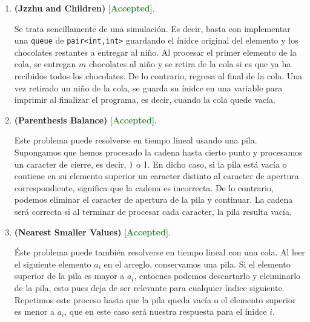 \documentclass{article}
\begin{document}
    \begin{enumerate}[label=\textbf{Problema \arabic*}]
        \item \textbf{(Jzzhu and Children)} [\textcolor{ForestGreen}{\textbf{Accepted}}].
    
        Se trata sencillamente de una simulación. Es decir, basta con implementar una \texttt{queue} de \texttt{pair<int,int>} guardando el ínidce original del elemento y los chocolates restantes a entregar al niño. Al procesar el primer elemento de la cola, se entregan $m$ chocolates al niño y se retira de la cola si es que ya ha recibidos todos los chocolates. De lo contrario, regresa al final de la cola. Una vez retirado un niño de la cola, se guarda su ínidce en una variable para imprimir al finalizar el programa, es decir, cuando la cola quede vacía. 

        \item \textbf{(Parenthesis Balance)} [\textcolor{ForestGreen}{\textbf{Accepted}}].
        
        Este problema puede resolverse en tiempo lineal usando una pila. Supongamos que hemos procesado la cadena hasta cierto punto y procesamos un caracter de cierre, es decir, \texttt{)} o \texttt{]}. En dicho caso, si la pila está vacía o contiene en su elemento superior un caracter distinto al caracter de apertura correspondiente, significa que la cadena es incorrecta. De lo contrario, podemos eliminar el caracter de apertura de la pila y continuar. La cadena será correcta si al terminar de procesar cada caracter, la pila resulta vacía.

        \item \textbf{(Nearest Smaller Values)} [\textcolor{ForestGreen}{\textbf{Accepted}}].
        
        Éste problema puede también resolverse en tiempo lineal con una cola. Al leer el siguiente elemento $a_i$ en el arreglo, conservamos una pila. Si el elemento superior de la pila es mayor a $a_i$, entocnes podemos descartarlo y eleiminarlo de la pila, esto pues deja de ser relevante para cualquier índice siguiente. Repetimos este proceso hasta que la pila queda vacía o el elemento superior es menor a $a_i$, que en este caso será nuestra respuesta para el ínidce $i$.
    \end{enumerate}
\end{document}
